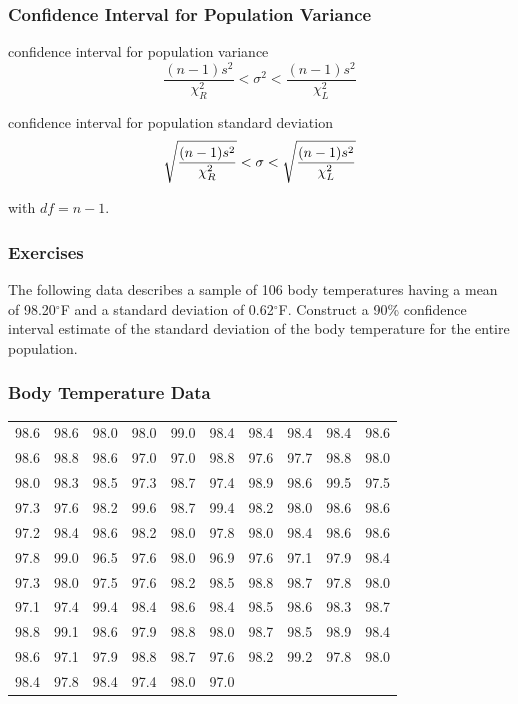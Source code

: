 \documentclass[xcolor=dvipsnames]{beamer}
\begin{document}
\begin{frame}
  \frametitle{Confidence Interval for Population Variance}
  \begin{block}{confidence interval for population variance}
    \begin{equation}
      \label{eq:zaozienu}
      \frac{(n-1)s^{2}}{\chi_{R}^{2}}<\sigma^{2}<\frac{(n-1)s^{2}}{\chi_{L}^{2}}
    \end{equation}
  \end{block}

\medskip

  \begin{block}{confidence interval for population standard deviation}
    \begin{equation}
      \label{eq:eikogohg}
      \sqrt{\frac{(n-1)s^{2}}{\chi_{R}^{2}}}<\sigma<\sqrt{\frac{(n-1)s^{2}}{\chi_{L}^{2}}}\notag
    \end{equation}
  \end{block}
with $df=n-1$.
\end{frame}

\begin{frame}
  \frametitle{Exercises}
  {\ubung} The following data describes a sample of 106 body
  temperatures having a mean of 98.20$^{\circ}$F and a standard
  deviation of 0.62$^{\circ}$F. Construct a 90\% confidence interval
  estimate of the standard deviation of the body temperature for the
  entire population. 
\end{frame}

\begin{frame}
  \frametitle{Body Temperature Data}
  \begin{tabular}{|rrrrrrrrrr|}\hline
    98.6 & 98.6 & 98.0 & 98.0 & 99.0 & 98.4 & 98.4 & 98.4 & 98.4 & 98.6 \\
    98.6 & 98.8 & 98.6 & 97.0 & 97.0 & 98.8 & 97.6 & 97.7 & 98.8 & 98.0 \\
    98.0 & 98.3 & 98.5 & 97.3 & 98.7 & 97.4 & 98.9 & 98.6 & 99.5 & 97.5 \\
    97.3 & 97.6 & 98.2 & 99.6 & 98.7 & 99.4 & 98.2 & 98.0 & 98.6 & 98.6 \\
    97.2 & 98.4 & 98.6 & 98.2 & 98.0 & 97.8 & 98.0 & 98.4 & 98.6 & 98.6 \\
    97.8 & 99.0 & 96.5 & 97.6 & 98.0 & 96.9 & 97.6 & 97.1 & 97.9 & 98.4 \\
    97.3 & 98.0 & 97.5 & 97.6 & 98.2 & 98.5 & 98.8 & 98.7 & 97.8 & 98.0 \\
    97.1 & 97.4 & 99.4 & 98.4 & 98.6 & 98.4 & 98.5 & 98.6 & 98.3 & 98.7 \\
    98.8 & 99.1 & 98.6 & 97.9 & 98.8 & 98.0 & 98.7 & 98.5 & 98.9 & 98.4 \\
    98.6 & 97.1 & 97.9 & 98.8 & 98.7 & 97.6 & 98.2 & 99.2 & 97.8 & 98.0 \\
    98.4 & 97.8 & 98.4 & 97.4 & 98.0 & 97.0 & &&& \\ \hline
  \end{tabular}
\end{frame}
\end{document}
